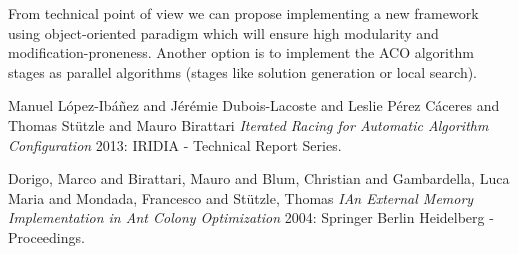 \documentclass[12pt]{article}
\begin{document}
From technical point of view we can propose implementing a new framework using object-oriented paradigm which will ensure high modularity and modification-proneness. Another option is to implement the ACO algorithm stages as parallel algorithms (stages like solution generation or local search).



\begin{thebibliography}{1}


 Manuel L{\'o}pez-Ib{\'a}{\~n}ez  and  J{\'e}r{\'e}mie Dubois-Lacoste  and Leslie {P{\'e}rez C{\'a}ceres}  and  Thomas St{\"u}tzle  and  Mauro Birattari {\em Iterated Racing for Automatic Algorithm Configuration} 2013: IRIDIA - Technical Report Series.
  
 Dorigo, Marco
and Birattari, Mauro
and Blum, Christian
and Gambardella, Luca Maria
and Mondada, Francesco
and St{\"u}tzle, Thomas {\em IAn External Memory Implementation in Ant Colony Optimization} 2004: Springer Berlin Heidelberg - Proceedings.

\end{thebibliography}

 
\end{document}
